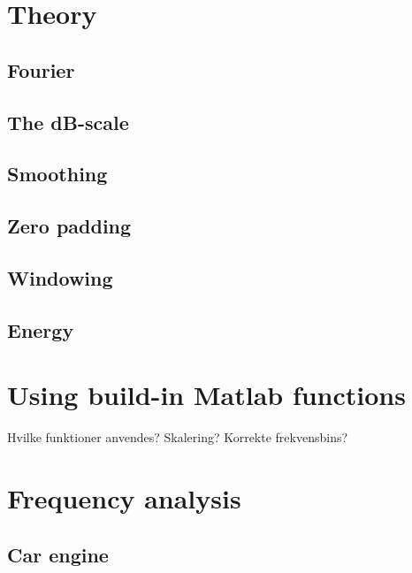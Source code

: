 \section{Theory}

\subsection{Fourier}

\subsection{The dB-scale}

\subsection{Smoothing}

\subsection{Zero padding}

\subsection{Windowing}

\subsection{Energy}

\section{Using build-in Matlab functions}
Hvilke funktioner anvendes?
Skalering?
Korrekte frekvensbins?



\section{Frequency analysis}
\subsection{Car engine}

